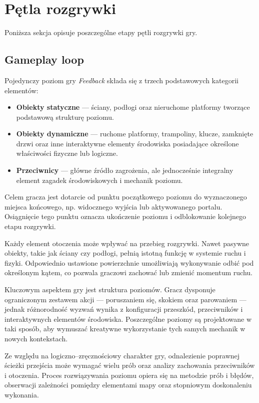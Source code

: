 \documentclass[11pt,a4paper]{article}
\begin{document}
\section{Pętla rozgrywki}

Poniższa sekcja opisuje poszczególne etapy pętli rozgrywki gry.
 \subsection{Gameplay loop}

Pojedynczy poziom gry \textit{Feedback} składa się z trzech podstawowych kategorii elementów:
\begin{itemize}
    \item \textbf{Obiekty statyczne} --- ściany, podłogi oraz nieruchome platformy tworzące podstawową strukturę poziomu.
    \item \textbf{Obiekty dynamiczne} --- ruchome platformy, trampoliny, klucze, zamknięte drzwi oraz inne interaktywne elementy środowiska posiadające określone właściwości fizyczne lub logiczne.
    \item \textbf{Przeciwnicy} --- główne źródło zagrożenia, ale jednocześnie integralny element zagadek środowiskowych i mechanik poziomu.
\end{itemize}

Celem gracza jest dotarcie od punktu początkowego poziomu do wyznaczonego miejsca końcowego, np. widocznego wyjścia lub aktywowanego portalu. Osiągnięcie tego punktu oznacza ukończenie poziomu i odblokowanie kolejnego etapu rozgrywki.

Każdy element otoczenia może wpływać na przebieg rozgrywki. Nawet pasywne obiekty, takie jak ściany czy podłogi, pełnią istotną funkcję w systemie ruchu i fizyki. Odpowiednio ustawione powierzchnie umożliwiają wykonywanie odbić pod określonym kątem, co pozwala graczowi zachować lub zmienić momentum ruchu.

Kluczowym aspektem gry jest struktura poziomów. Gracz dysponuje ograniczonym zestawem akcji --- poruszaniem się, skokiem oraz parowaniem --- jednak różnorodność wyzwań wynika z konfiguracji przeszkód, przeciwników i interaktywnych elementów środowiska. Poszczególne poziomy są projektowane w taki sposób, aby wymuszać kreatywne wykorzystanie tych samych mechanik w nowych kontekstach.

Ze względu na logiczno--zręcznościowy charakter gry, odnalezienie poprawnej ścieżki przejścia może wymagać wielu prób oraz analizy zachowania przeciwników i otoczenia. Proces rozwiązywania poziomu opiera się na metodzie prób i błędów, obserwacji zależności pomiędzy elementami mapy oraz stopniowym doskonaleniu wykonania.
\end{document}
